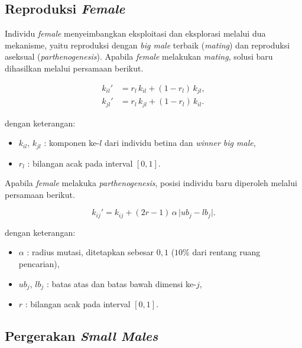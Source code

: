 
    \subsection{Reproduksi \textit{Female}}\label{sub:female}

    Individu \textit{female} menyeimbangkan eksploitasi dan eksplorasi melalui dua mekanisme, yaitu reproduksi dengan \textit{big male} terbaik (\textit{mating}) dan reproduksi aseksual (\textit{parthenogenesis}). Apabila \textit{female} melakukan \textit{mating}, solusi baru dihasilkan melalui persamaan berikut.

    \begin{align}
        \label{eq:female-mating1}
        k_{il}' &= r_l\,k_{il} + (1-r_l)\,k_{jl}, \\
        \label{eq:female-mating2}
        k_{jl}' &= r_l\,k_{jl} + (1-r_l)\,k_{il}.
    \end{align}

    dengan keterangan:
    \begin{itemize}
        \item $k_{il},\,k_{jl}$ : komponen ke-$l$ dari individu betina dan
        \textit{winner big male},
        \item $r_l$ : bilangan acak pada interval $[0,1]$.
    \end{itemize}

    Apabila \textit{female} melakuka \textit{parthenogenesis}, posisi individu baru diperoleh melalui persamaan berikut.

    \begin{equation}
    \label{eq:female-parth}
    k_{ij}' = k_{ij} + (2r - 1)\,\alpha\,\lvert ub_j - lb_j \rvert.
    \end{equation}

    dengan keterangan:
    \begin{itemize}
        \item $\alpha$ : radius mutasi, ditetapkan sebesar $0{,}1$ ($10\%$ dari
        rentang ruang pencarian),
        \item $ub_j,\,lb_j$ : batas atas dan batas bawah dimensi ke-$j$,
        \item $r$ : bilangan acak pada interval $[0,1]$.
    \end{itemize}


    \subsection{Pergerakan \textit{Small Males}}\label{sub:small-males}

